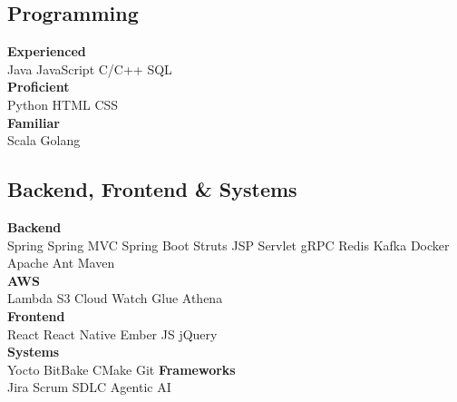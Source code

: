 \documentclass[11pt]{plushcv}
\begin{document}
\begin{minipage}[t]{0.45\textwidth}
\subsection{Programming}
\fontsize{11pt}{13pt}\selectfont %
\textbf{Experienced}\\ Java \textbullet{} JavaScript \textbullet{} C/C++ \textbullet{} SQL \\ \textbf{Proficient}\\ Python \textbullet{} HTML \textbullet{} CSS \\
\textbf{Familiar}\\ Scala \textbullet{} Golang
\end{minipage}
\hfill
\begin{minipage}[t]{0.52\textwidth}
\subsection{Backend, Frontend \& Systems}
\fontsize{11pt}{13pt}\selectfont %
\textbf{Backend}\\ Spring \textbullet{} Spring MVC \textbullet{} Spring Boot \textbullet{} Struts \textbullet{} JSP \textbullet{} Servlet \textbullet{} gRPC  \textbullet{} Redis \textbullet{} Kafka \textbullet{} Docker \textbullet{} Apache Ant \textbullet{} Maven \\
\textbf{AWS}\\ Lambda \textbullet{} S3 \textbullet{} Cloud Watch \textbullet{} Glue \textbullet{} Athena \\
\textbf{Frontend}\\ React \textbullet{} React Native \textbullet{} Ember JS \textbullet{} jQuery \\
\textbf{Systems}\\ Yocto \textbullet{} BitBake \textbullet{} CMake \textbullet{} Git
\textbf{Frameworks}\\ Jira \textbullet{} Scrum \textbullet{} SDLC \textbullet{} Agentic AI
\end{minipage}

\vspace{25pt} %

\end{document}
